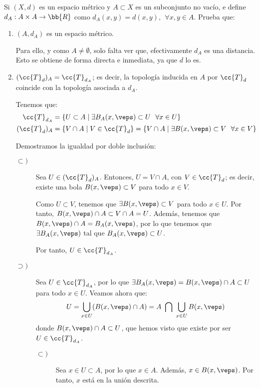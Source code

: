 \begin{ejercicio}
    Si $(X,d)$ es un espacio métrico y $A\subset X$ es un subconjunto no vacío, e define $d_A:A\times A\to \bb{R}$ como $d_A(x,y)=d(x,y),~~\forall x,y\in A$. Prueba que:
    \begin{enumerate}
        \item $(A,d_A)$ es un espacio métrico.

        Para ello, y como $A\neq \emptyset$, solo falta ver que, efectivamente $d_A$ es una distancia. Esto se obtiene de forma directa e inmediata, ya que $d$ lo es.
        
        \item $(\cc{T}_d)_A=\cc{T}_{d_A}$; es decir, la topología inducida en $A$ por $\cc{T}_d$ coincide con la topología asociada a $d_A$.

        Tenemos que:
        \begin{equation*}\begin{split}
            \cc{T}_{d_A}&=\{U\subset A\mid \exists B_A(x,\veps)\subset U~~ \forall x\in U\}\\
            (\cc{T}_d)_A &= \{V\cap A\mid V\in \cc{T}_d\}
            = \{V\cap A\mid \exists B(x,\veps)\subset V~~ \forall x\in V\}
        \end{split}\end{equation*}

        Demostramos la igualdad por doble inclusión:
        \begin{description}
            \item[$\subset)$]

            Sea $U\in (\cc{T}_d)_A$. Entonces, $U=V\cap A$, con $V\in \cc{T}_d$; es decir, existe una bola $B(x,\veps)\subset V$ para todo $x\in V$.

            Como $U\subset V$, tenemos que $\exists B(x,\veps)\subset V$ para todo $x\in U$. Por tanto, $B(x,\veps)\cap A\subset V\cap A=U$. Además, tenemos que $B(x,\veps)\cap A=B_A(x,\veps)$, por lo que tenemos que $\exists B_A(x,\veps)$ tal que $B_A(x,\veps)\subset U$.
            
            Por tanto, $U\in \cc{T}_{d_A}$.

            \item[$\supset)$] Sea $U\in \cc{T}_{d_A}$, por lo que $\exists B_A(x,\veps)=B(x,\veps)\cap A\subset U$ para todo $x\in U$. Veamos ahora que:
            \begin{equation*}
                U=\bigcup_{x\in U}(B(x,\veps) \cap A) = A~\bigcap~\bigcup_{x\in U}B(x,\veps)
            \end{equation*}
            donde $B(x,\veps)\cap A\subset U$, que hemos visto que existe por ser $U\in \cc{T}_{d_A}$.
            \begin{description}
                \item[$\subset)$] Sea $x\in U\subset A$, por lo que $x\in A$. Además, $x\in B(x,\veps)$. Por tanto, $x$ está en la unión descrita.
                

\end{description}
\end{description}
\end{enumerate}
\end{ejercicio}
